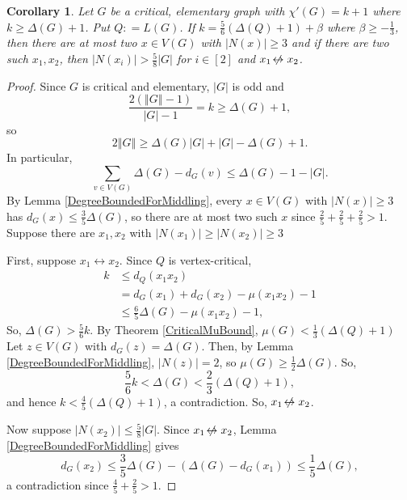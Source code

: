 \documentclass[12pt]{amsart}
\theoremstyle{plain}
\newtheorem{cor}[thm]{Corollary}
\theoremstyle{definition}
\theoremstyle{remark}
\newcommand{\card}[1]{\left|#1\right|}
\newcommand{\size}[1]{\left\Vert#1\right\Vert}
\newcommand{\irange}[1]{\left[#1\right]}
\newcommand{\parens}[1]{\left( #1 \right)}
\newcommand{\DefinedAs}{\mathrel{\mathop:}=}
\def\adj{\leftrightarrow}
\def\nonadj{\not\!\leftrightarrow}
\begin{document}
\begin{cor}\label{CriticalElementary56}
Let $G$ be a critical, elementary graph with $\chi'(G) = k + 1$ where $k \ge \Delta(G) + 1$.  Put $Q \DefinedAs L(G)$. 
If $k = \frac56\parens{\Delta(Q) + 1} + \beta$ where $\beta \ge -\frac13$, then there are at most two $x \in V(G)$ with $\card{N(x)} \ge 3$
and if there are two such $x_1, x_2$, then $\card{N(x_i)} > \frac58\card{G}$ for $i \in \irange{2}$ and $x_1 \nonadj x_2$.
\end{cor}
\begin{proof}
Since $G$ is critical and elementary, $\card{G}$ is odd and
\[\frac{2(\size{G} - 1)}{\card{G} - 1} = k \ge \Delta(G) + 1,\]
so
\[2\size{G} \ge \Delta(G)\card{G} + \card{G} - \Delta(G) + 1.\]
In particular,
\[\sum_{v \in V(G)} \Delta(G) - d_G(v) \le \Delta(G) - 1 - \card{G}.\]
By Lemma \ref{DegreeBoundedForMiddling}, every $x \in V(G)$ with $\card{N(x)} \ge 3$ has $d_G(x) \le \frac35\Delta(G)$, so there are at most two such $x$ since
$\frac25 + \frac25 + \frac25 > 1$.  Suppose there are $x_1, x_2$ with $\card{N(x_1)} \ge \card{N(x_2)} \ge 3$

First, suppose $x_1 \adj x_2$.  Since $Q$ is vertex-critical, 
\begin{align*}
k &\le d_Q(x_1x_2)\\
&=d_G(x_1) + d_G(x_2) - \mu(x_1x_2) - 1\\
&\le \frac65\Delta(G) - \mu(x_1x_2) - 1,
\end{align*}
So, $\Delta(G) >\frac56k$.  By Theorem \ref{CriticalMuBound}, $\mu(G) < \frac13(\Delta(Q) + 1)$ Let $z \in V(G)$ with $d_G(z) = \Delta(G)$.  Then, by Lemma \ref{DegreeBoundedForMiddling}, $\card{N(z)} = 2$, so $\mu(G) \ge \frac12\Delta(G)$.  So,
\[\frac56k < \Delta(G) < \frac23(\Delta(Q) + 1),\]
and hence $k < \frac45(\Delta(Q) + 1)$, a contradiction.  So, $x_1 \nonadj x_2$.

Now suppose $\card{N(x_2)} \le \frac58\card{G}$.  Since $x_1 \nonadj x_2$, Lemma \ref{DegreeBoundedForMiddling} gives
\[d_G(x_2) \le \frac35\Delta(G) - (\Delta(G) - d_G(x_1)) \le \frac15\Delta(G),\]
a contradiction since $\frac45 + \frac25 > 1$.
\end{proof}
\end{document}
